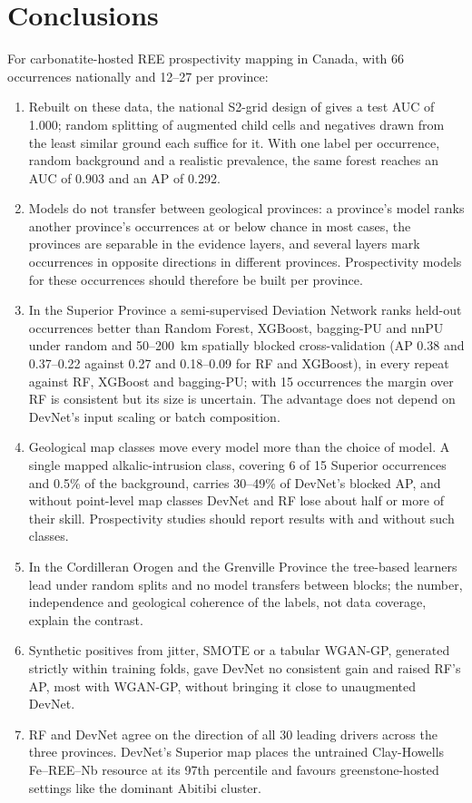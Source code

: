 \documentclass[pdflatex,sn-apa]{sn-jnl}
\begin{document}
\section{Conclusions}\label{sec:conclusions}

For carbonatite-hosted REE prospectivity mapping in Canada, with 66 occurrences nationally and 12--27 per province:
\begin{enumerate}
\item Rebuilt on these data, the national S2-grid design of \citet{Parsa2024} gives a test AUC of 1.000; random splitting of augmented child cells and negatives drawn from the least similar ground each suffice for it. With one label per occurrence, random background and a realistic prevalence, the same forest reaches an AUC of 0.903 and an AP of 0.292.
\item Models do not transfer between geological provinces: a province's model ranks another province's occurrences at or below chance in most cases, the provinces are separable in the evidence layers, and several layers mark occurrences in opposite directions in different provinces. Prospectivity models for these occurrences should therefore be built per province.
\item In the Superior Province a semi-supervised Deviation Network ranks held-out occurrences better than Random Forest, XGBoost, bagging-PU and nnPU under random and 50--200~km spatially blocked cross-validation (AP 0.38 and 0.37--0.22 against 0.27 and 0.18--0.09 for RF and XGBoost), in every repeat against RF, XGBoost and bagging-PU; with 15 occurrences the margin over RF is consistent but its size is uncertain. The advantage does not depend on DevNet's input scaling or batch composition.
\item Geological map classes move every model more than the choice of model. A single mapped alkalic-intrusion class, covering 6 of 15 Superior occurrences and 0.5\% of the background, carries 30--49\% of DevNet's blocked AP, and without point-level map classes DevNet and RF lose about half or more of their skill. Prospectivity studies should report results with and without such classes.
\item In the Cordilleran Orogen and the Grenville Province the tree-based learners lead under random splits and no model transfers between blocks; the number, independence and geological coherence of the labels, not data coverage, explain the contrast.
\item Synthetic positives from jitter, SMOTE or a tabular WGAN-GP, generated strictly within training folds, gave DevNet no consistent gain and raised RF's AP, most with WGAN-GP, without bringing it close to unaugmented DevNet.
\item RF and DevNet agree on the direction of all 30 leading drivers across the three provinces. DevNet's Superior map places the untrained Clay-Howells Fe--REE--Nb resource at its 97th percentile and favours greenstone-hosted settings like the dominant Abitibi cluster.
\end{enumerate}
\end{document}
